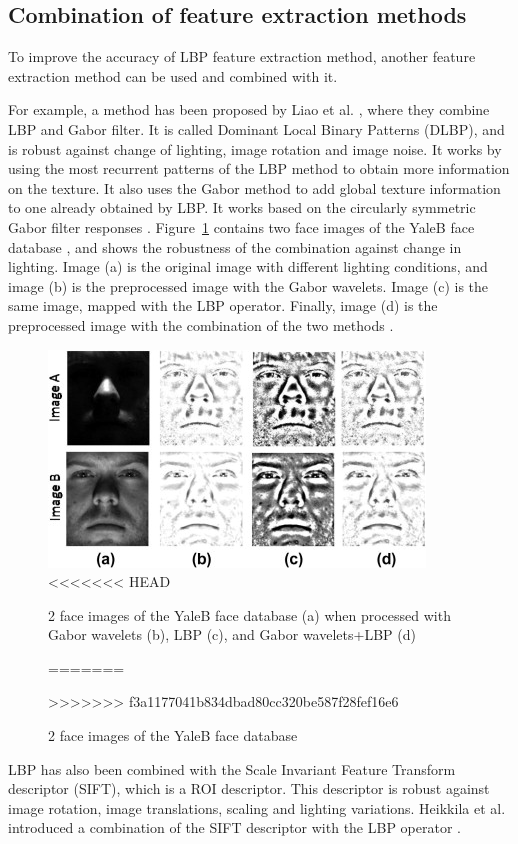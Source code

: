 \subsection{Combination of feature extraction methods}

\vspace{\baselineskip}
\noindent To improve the accuracy of LBP feature extraction method, another feature extraction method can be used and combined with it. 
\newline

\noindent  For example, a method has been proposed by Liao et al. \cite{LIA09}, where they combine LBP and Gabor filter. It is called Dominant Local Binary Patterns (DLBP), and is robust against change of lighting, image rotation and image noise.  It works by using the most recurrent patterns of the LBP method to obtain more information on the texture. It also uses the Gabor method to add global texture information to one already obtained by LBP. It works based on the circularly symmetric Gabor filter responses \cite{LIA09}. Figure~\ref{combination_lbp_gabor} contains two face images of the YaleB face database , and shows the robustness of the combination against change in lighting. Image (a) is the original image with different lighting conditions, and image (b) is the preprocessed image with the Gabor wavelets. Image (c) is the same image, mapped with the LBP operator. Finally, image (d) is the preprocessed image with the combination of the two methods \cite{GOH11}.
\newline

\begin{figure}[!h]
\begin{center}
\noindent \includegraphics[scale=1]{figures/combination_lbp_gabor} 
\newline
<<<<<<< HEAD
\caption{2 face images of the YaleB face database (a) when processed with Gabor wavelets (b), LBP (c), and Gabor wavelets+LBP (d)}
=======
\caption{2 face images of the YaleB face database \cite{GOH11}}
>>>>>>> f3a1177041b834dbad80cc320be587f28fef16e6
\label{combination_lbp_gabor}
\end{center} 
\end{figure}

\noindent  LBP has also been combined with the Scale Invariant Feature Transform descriptor (SIFT), which is a ROI descriptor. This descriptor is robust against image rotation, image translations, scaling and lighting variations. Heikkila et al. introduced a combination of the SIFT descriptor with the LBP operator \cite{HEI09}.
\newline
